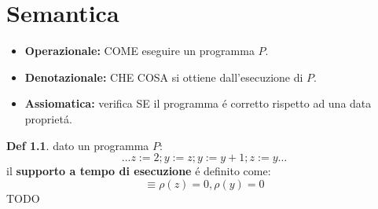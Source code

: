 \documentclass[a4paper]{report}
\theoremstyle{definition} \newtheorem*{defi}{Def}
\theoremstyle{plain} \newtheorem{lemma}{Lemma}
\theoremstyle{plain} \newtheorem{teo}{Teorema}
\theoremstyle{remark} \newtheorem*{es}{Esempio}
\begin{document}
\chapter{Semantica}
\begin{itemize}
	\item {\bf Operazionale:} COME eseguire un programma $P$.
	\item {\bf Denotazionale:} CHE COSA si ottiene dall'esecuzione di $P$.
	\item {\bf Assiomatica:} verifica SE il programma \'e corretto rispetto ad una data propriet\'a.
\end{itemize}
\begin{defi} dato un programma $P$:
	\begin{equation}
		{\ldots}z:=2; y:=z; y:=y+1; z:=y{\ldots}
	\end{equation}
	il {\bf supporto a tempo di esecuzione} \'e definito come:
	\begin{equation}
		[z=0, y=0] \equiv \rho(z) = 0, \rho(y) = 0
	\end{equation}
	TODO
\end{defi}
\end{document}
